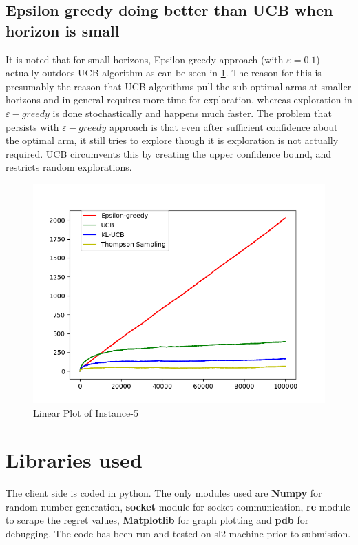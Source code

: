 \documentclass{article}
\begin{document}
\subsection{Epsilon greedy doing better than UCB when horizon is small}
It is noted that for small horizons, Epsilon greedy approach (with $\varepsilon = 0.1$) actually outdoes UCB algorithm as can be seen in \ref{fig:inst5_lin}. The reason for this is presumably the reason that UCB algorithms pull the sub-optimal arms at smaller horizons and in general requires more time for exploration, whereas exploration in $\varepsilon - greedy$ is done stochastically and happens much faster. The problem that persists with $\varepsilon - greedy$ approach is that even after sufficient confidence about the optimal arm, it still tries to explore though it is exploration is not actually required. UCB circumvents this by creating the upper confidence bound, and restricts random explorations.
\begin{figure}[H]
  \centering
  \includegraphics[scale=1]{images/Instance-5_linear}
  \caption{Linear Plot of Instance-5}
  \label{fig:inst5_lin}
\end{figure}

\section{Libraries used}
The client side is coded in python. The only modules used are {\bf Numpy} for random number generation, \textbf{socket} module for socket communication, \textbf{re} module to scrape the regret values, \textbf{Matplotlib} for graph plotting and \textbf{pdb} for debugging. The code has been run and tested on sl2 machine prior to submission.
\end{document}
